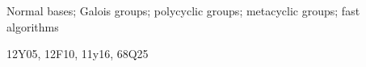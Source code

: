 \begin{keywords}
Normal bases; Galois groups; polycyclic groups; metacyclic groups; fast algorithms
\end{keywords}

\begin{subject}
12Y05, 12F10, 11y16, 68Q25
\end{subject}




\newcommand{\F}{{\mathsf{F}}}
\newcommand{\K}{{\mathsf{K}}}

\newcommand{\NN}{{\mathbb{N}}}
\newcommand{\N}{{\mathbb{N}}}

\def\A{\mathbb{A}}
\def\H{\mathbb{H}}
\def\B{\mathbb{B}}
\def\Z{\mathbb{Z}}
\def\C{\mathbb{C}}
\def\Q{\mathbb{Q}}
\def\D{\mathbb{D}}
\newcommand{\QQ}{\mathbb{Q}}
\newcommand{\mat}[1]{\mathbf{\MakeUppercase{#1}}} %

\newcommand{\osum}[2]{\alpha_{#1,#2}}
\newcommand{\osumcost}{O(n^{(3/4)\cdot \omega(4/3)})}
\newcommand{\osumcosttilde}{\tilde{O}(n^{(3/4)\cdot \omega(4/3)})}
\newcommand{\thecost}{\tilde{O}(n^{(3/4)\cdot \omega(4/3)})}
\newcommand{\alg}{$\tilde{O}(n^{(3/4)\cdot \omega(4/3)})$}

\newcommand{\FF}{{\mathbb{F}}}
\newcommand{\xbar}{\xi}
\newcommand{\zbar}{\zeta}

\newcommand{\citeN}{\citet}






\noacknowledge%
                 









% 





